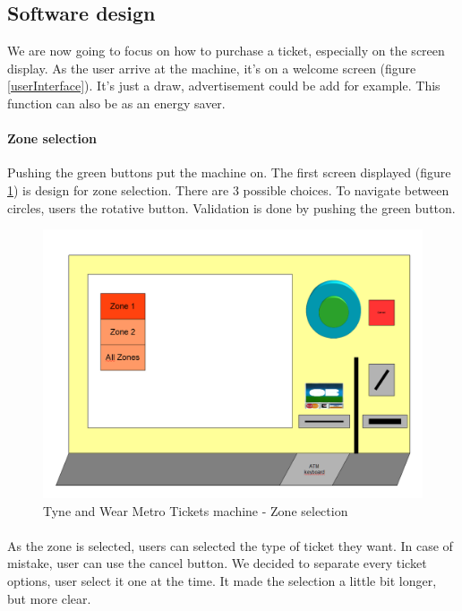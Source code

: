 \documentclass[a4paper,12pt]{article} %
\begin{document}
\subsection{Software design}
We are now going to focus on how to purchase a ticket, especially on the screen display. As the user arrive at the machine, it's on a welcome screen (figure \ref{userInterface}). It's just a draw, advertisement could be add for example. This function can also be as an energy saver.
\paragraph{Zone selection}Pushing the green buttons put the machine on. The first screen displayed (figure \ref{ticket1}) is design for zone selection. There are 3 possible choices. To navigate between circles, users the rotative button. Validation is done by pushing the green button. 
\begin{figure}[h!]
\includegraphics[width=1\linewidth]{interaction2.png}
\caption{\label{ticket1} Tyne and Wear Metro Tickets machine - Zone selection}
\end{figure}
\paragraph{}As the zone is selected, users can selected the type of ticket they want. In case of mistake, user can use the cancel button. We decided to separate every ticket options, user select it one at the time. It made the selection a little bit longer, but more clear.
\end{document}
